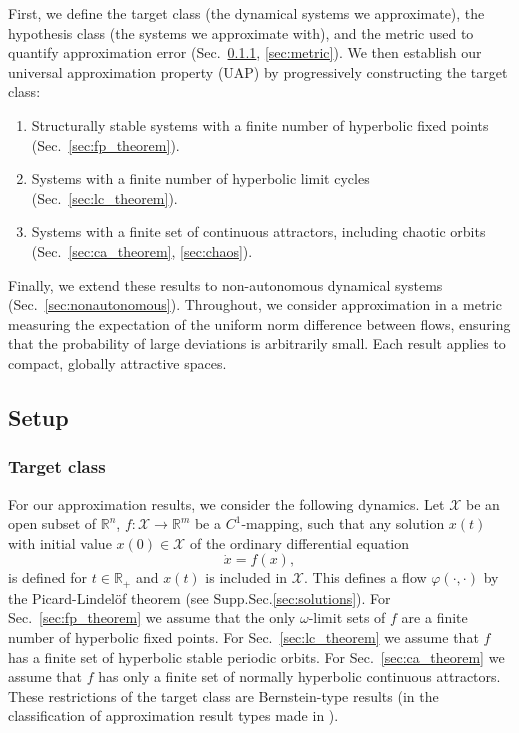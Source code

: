 \documentclass{article}
\theoremstyle{definition} \newtheorem{definition}{Definition}
\theoremstyle{remark} \newtheorem{remark}{Remark}
\newcommand{\reals}{\mathbb{R}}
\newcounter{ct}
\begin{document}
First, we define the target class (the dynamical systems we approximate), the hypothesis class (the systems we approximate with), and the metric used to quantify approximation error (Sec.~\ref{sec:target}, \ref{sec:metric}). We then establish our universal approximation property (UAP) by progressively constructing the target class:
\begin{enumerate}
\item Structurally stable systems with a finite number of hyperbolic fixed points (Sec.~\ref{sec:fp_theorem}).
\item Systems with a finite number of hyperbolic limit cycles (Sec.~\ref{sec:lc_theorem}).
\item Systems with a finite set of continuous attractors, including chaotic orbits (Sec.~\ref{sec:ca_theorem}, \ref{sec:chaos}).
\end{enumerate}
Finally, we extend these results to non-autonomous dynamical systems (Sec.~\ref{sec:nonautonomous}). Throughout, we consider approximation in a metric measuring the expectation of the uniform norm difference between flows, ensuring that the probability of large deviations is arbitrarily small. Each result applies to compact, globally attractive spaces.


\subsection{Setup}
\subsubsection{Target class}\label{sec:target}
For our approximation results, we consider the following dynamics.
Let $\mathcal{X}$ be an open subset of $\mathbb{R}^n$,
 $f\colon \mathcal{X} \to \mathbb{R}^m$ be a $C^1$-mapping,
 such that any solution $x(t)$ with initial value $x(0) \in \mathcal{X}$ of the ordinary differential equation %
\begin{equation}\label{eq:mlp_vf}
    \dot{x} = f(x),
\end{equation}
is defined for $t\in\reals_{+}$ and $x(t)$ is included in $\mathcal{X}$. %
This defines a flow $\varphi(\cdot, \cdot)$ by the Picard-Lindel\"of theorem (see Supp.Sec.\ref{sec:solutions}).
For Sec.~\ref{sec:fp_theorem} we assume that the only $\omega$-limit sets of  $f$ are a finite number of hyperbolic fixed points.
For Sec.~\ref{sec:lc_theorem} we assume that $f$ has a finite set of hyperbolic stable periodic orbits.
For Sec.~\ref{sec:ca_theorem} we assume that $f$ has only a finite set of normally hyperbolic continuous attractors.
%
These restrictions of the target class are Bernstein-type results (in the classification of approximation result types made in \citep{jiang2023brief}).
\end{document}
